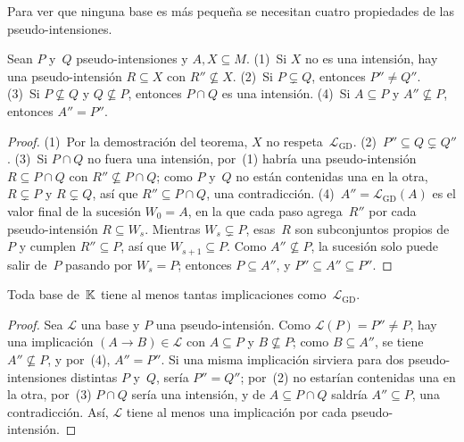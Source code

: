 Para ver que ninguna base es más pequeña se necesitan cuatro propiedades de las pseudo-intensiones.

\begin{lema}\label{lem:pseudo}
Sean $P$ y~$Q$ pseudo-intensiones y $A, X \subseteq M$. (1)~Si $X$ no es una intensión, hay una pseudo-intensión $R \subseteq X$ con $R'' \not\subseteq X$. (2)~Si $P \subsetneq Q$, entonces $P'' \neq Q''$. (3)~Si $P \not\subseteq Q$ y $Q \not\subseteq P$, entonces $P \cap Q$ es una intensión. (4)~Si $A \subseteq P$ y $A'' \not\subseteq P$, entonces $A'' = P''$.
\end{lema}

\begin{proof}
(1)~Por la demostración del teorema, $X$ no respeta~$\mathcal{L}_{\mathrm{GD}}$. (2)~$P'' \subseteq Q \subsetneq Q''$. (3)~Si $P \cap Q$ no fuera una intensión, por~(1) habría una pseudo-intensión $R \subseteq P \cap Q$ con $R'' \not\subseteq P \cap Q$; como $P$ y~$Q$ no están contenidas una en la otra, $R \subsetneq P$ y $R \subsetneq Q$, así que $R'' \subseteq P \cap Q$, una contradicción. (4)~$A'' = \mathcal{L}_{\mathrm{GD}}(A)$ es el valor final de la sucesión $W_0 = A$, en la que cada paso agrega~$R''$ por cada pseudo-intensión $R \subseteq W_s$. Mientras $W_s \subsetneq P$, esas~$R$ son subconjuntos propios de~$P$ y cumplen $R'' \subseteq P$, así que $W_{s+1} \subseteq P$. Como $A'' \not\subseteq P$, la sucesión solo puede salir de~$P$ pasando por $W_s = P$; entonces $P \subseteq A''$, y $P'' \subseteq A'' \subseteq P''$.
\end{proof}

\begin{teorema}\label{teo:gd-minima}
Toda base de~$\mathbb{K}$ tiene al menos tantas implicaciones como~$\mathcal{L}_{\mathrm{GD}}$.
\end{teorema}

\begin{proof}
Sea $\mathcal{L}$ una base y $P$ una pseudo-intensión. Como $\mathcal{L}(P) = P'' \neq P$, hay una implicación $(A \to B) \in \mathcal{L}$ con $A \subseteq P$ y $B \not\subseteq P$; como $B \subseteq A''$, se tiene $A'' \not\subseteq P$, y por~(4), $A'' = P''$. Si una misma implicación sirviera para dos pseudo-intensiones distintas $P$ y~$Q$, sería $P'' = Q''$; por~(2) no estarían contenidas una en la otra, por~(3) $P \cap Q$ sería una intensión, y de $A \subseteq P \cap Q$ saldría $A'' \subseteq P$, una contradicción. Así, $\mathcal{L}$ tiene al menos una implicación por cada pseudo-intensión.
\end{proof}

